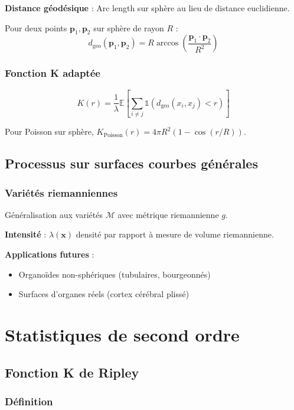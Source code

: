 \textbf{Distance géodésique} : Arc length sur sphère au lieu de distance euclidienne.

Pour deux points $\mathbf{p}_1, \mathbf{p}_2$ sur sphère de rayon $R$ :
\[
d_{\text{geo}}(\mathbf{p}_1, \mathbf{p}_2) = R \arccos\left(\frac{\mathbf{p}_1 \cdot \mathbf{p}_2}{R^2}\right)
\]

\subsubsection{Fonction K adaptée}

\[
K(r) = \frac{1}{\lambda} \mathbb{E}\left[\sum_{i \neq j} \mathbb{1}(d_{\text{geo}}(x_i, x_j) < r)\right]
\]

Pour Poisson sur sphère, $K_{\text{Poisson}}(r) = 4\pi R^2 (1 - \cos(r/R))$.

\subsection{Processus sur surfaces courbes générales}

\subsubsection{Variétés riemanniennes}

Généralisation aux variétés $\mathcal{M}$ avec métrique riemannienne $g$.

\textbf{Intensité} : $\lambda(\mathbf{x})$ densité par rapport à mesure de volume riemannienne.

\textbf{Applications futures} : 
\begin{itemize}
    \item Organoïdes non-sphériques (tubulaires, bourgeonnés)
    \item Surfaces d'organes réels (cortex cérébral plissé)
\end{itemize}

\section{Statistiques de second ordre}

\subsection{Fonction K de Ripley}

\subsubsection{Définition}

